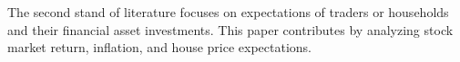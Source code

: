 \documentclass[ProjectABM]{subfiles}
\begin{document}






The second stand of literature focuses on expectations of traders or households and their financial asset investments. This paper contributes by analyzing stock market return, inflation, and house price expectations.
\end{document}
